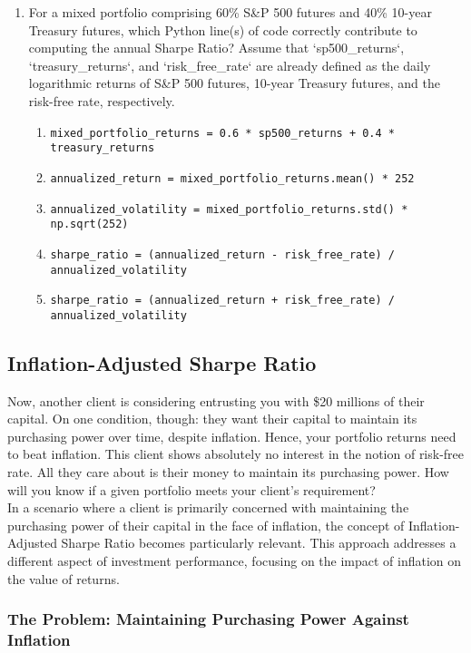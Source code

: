 \documentclass{article}
\begin{document}
\begin{enumerate}
    \item For a mixed portfolio comprising 60\% S\&P 500 futures and 40\% 10-year Treasury futures, which Python line(s) of code correctly contribute to computing the annual Sharpe Ratio? Assume that `sp500\_returns`, `treasury\_returns`, and `risk\_free\_rate` are already defined as the daily logarithmic returns of S\&P 500 futures, 10-year Treasury futures, and the risk-free rate, respectively.
    \begin{enumerate}
        \item \texttt{mixed\_portfolio\_returns = 0.6 * sp500\_returns + 0.4 * treasury\_returns}
        \item \texttt{annualized\_return = mixed\_portfolio\_returns.mean() * 252}
        \item \texttt{annualized\_volatility = mixed\_portfolio\_returns.std() * np.sqrt(252)}
        \item \texttt{sharpe\_ratio = (annualized\_return - risk\_free\_rate) / annualized\_volatility}
        \item \texttt{sharpe\_ratio = (annualized\_return + risk\_free\_rate) / annualized\_volatility}
    \end{enumerate}
\end{enumerate}

\subsection{Inflation-Adjusted Sharpe Ratio}

Now, another client is considering entrusting you with \$20 millions of their capital. On one condition, though: they want their capital to maintain its purchasing power over time, despite inflation. Hence, your portfolio returns need to beat inflation. This client shows absolutely no interest in the notion of risk-free rate. All they care about is their money to maintain its purchasing power. How will you know if a given portfolio meets your client's requirement? \\

In a scenario where a client is primarily concerned with maintaining the purchasing power of their capital in the face of inflation, the concept of Inflation-Adjusted Sharpe Ratio becomes particularly relevant. This approach addresses a different aspect of investment performance, focusing on the impact of inflation on the value of returns. \\

\subsubsection{The Problem: Maintaining Purchasing Power Against Inflation}
\end{document}
